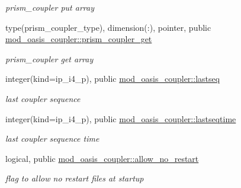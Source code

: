 \begin{DoxyCompactItemize}
\begin{DoxyCompactList}\small\item\em prism\+\_\+coupler put array \end{DoxyCompactList}\item 
type(prism\+\_\+coupler\+\_\+type), dimension(\+:), pointer, public \hyperlink{namespacemod__oasis__coupler_a96df3ef2ec1b53597bb9beca43fe8349}{mod\+\_\+oasis\+\_\+coupler\+::prism\+\_\+coupler\+\_\+get}
\begin{DoxyCompactList}\small\item\em prism\+\_\+coupler get array \end{DoxyCompactList}\item 
integer(kind=ip\+\_\+i4\+\_\+p), public \hyperlink{namespacemod__oasis__coupler_a0cb9b8a96c10385d38fa244d920c7eaf}{mod\+\_\+oasis\+\_\+coupler\+::lastseq}
\begin{DoxyCompactList}\small\item\em last coupler sequence \end{DoxyCompactList}\item 
integer(kind=ip\+\_\+i4\+\_\+p), public \hyperlink{namespacemod__oasis__coupler_a47f4727f94719892d837f6a1545d3d08}{mod\+\_\+oasis\+\_\+coupler\+::lastseqtime}
\begin{DoxyCompactList}\small\item\em last coupler sequence time \end{DoxyCompactList}\item 
logical, public \hyperlink{namespacemod__oasis__coupler_ab494fbbb8065f3a006892828f288e44a}{mod\+\_\+oasis\+\_\+coupler\+::allow\+\_\+no\+\_\+restart}
\begin{DoxyCompactList}\small\item\em flag to allow no restart files at startup \end{DoxyCompactList}\end{DoxyCompactItemize}
